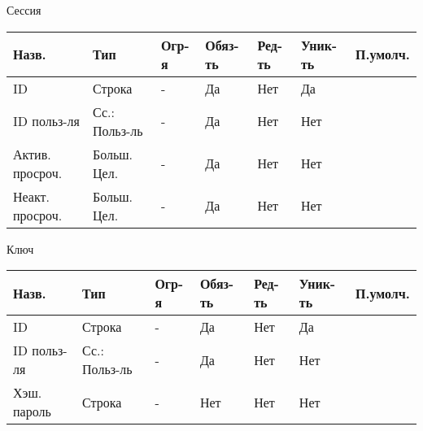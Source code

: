 \documentclass[../document.tex]{subfiles}
\begin{document}
Сессия

\begin{tabular}{ | l | l | l | l | l | l | l | }
  \hline
  Назв.           & Тип           & Огр-я & Обяз-ть & Ред-ть & Уник-ть & П.умолч. \\
  \hline
  ID              & Строка        & -     & Да      & Нет    & Да      &          \\
  ID польз-ля     & Сс.: Польз-ль & -     & Да      & Нет    & Нет     &          \\
  Актив. просроч. & Больш. Цел.   & -     & Да      & Нет    & Нет     &          \\
  Неакт. просроч. & Больш. Цел.   & -     & Да      & Нет    & Нет     &          \\
  \hline
\end{tabular}

Ключ

\begin{tabular}{ | l | l | l | l | l | l | l | }
  \hline
  Назв.       & Тип           & Огр-я & Обяз-ть & Ред-ть & Уник-ть & П.умолч. \\
  \hline
  ID          & Строка        & -     & Да      & Нет    & Да      &          \\
  ID польз-ля & Сс.: Польз-ль & -     & Да      & Нет    & Нет     &          \\
  Хэш. пароль & Строка        & -     & Нет     & Нет    & Нет     &          \\
  \hline
\end{tabular}
\end{document}
